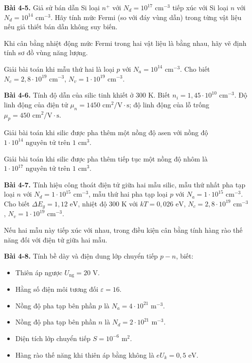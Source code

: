\expandafter\def\csname debai@4-5\endcsname{
\textbf{Bài 4-5.} Giả sử bán dẫn Si loại $n^+$ với $N_d = 10^{17}\text{ cm}^{-3}$ tiếp xúc với Si loại $n$ với $N_d = 10^{14}\text{ cm}^{-3}$. Hãy tính mức Fermi (so với đáy vùng dẫn) trong từng vật liệu nếu giả thiết bán dẫn không suy biến.

Khi cân bằng nhiệt động mức Fermi trong hai vật liệu là bằng nhau, hãy vẽ định tính sơ đồ vùng năng lượng.

Giải bài toán khi mẫu thứ hai là loại $p$ với $N_a = 10^{14}\text{ cm}^{-3}$. Cho biết $N_c = 2{,}8 \cdot 10^{19}\text{ cm}^{-3}$, $N_v = 1 \cdot 10^{19}\text{ cm}^{-3}$.
}

\expandafter\def\csname debai@4-6\endcsname{
\textbf{Bài 4-6.} Tính độ dẫn của silic tinh khiết ở $300\text{ K}$. Biết $n_i = 1{,}45 \cdot 10^{10}\text{ cm}^{-3}$. Độ linh động của điện tử $\mu_n = 1450\text{ cm}^2/\text{V}\cdot\text{s}$; độ linh động của lỗ trống $\mu_p = 450\text{ cm}^2/\text{V}\cdot\text{s}$.

Giải bài toán khi silic được pha thêm một nồng độ asen với nồng độ $1 \cdot 10^{14}\text{ nguyên tử trên } 1\text{ cm}^3$.

Giải bài toán khi silic được pha thêm tiếp tục một nồng độ nhôm là $1 \cdot 10^{17}\text{ nguyên tử trên } 1\text{ cm}^3$.
}

\expandafter\def\csname debai@4-7\endcsname{
\textbf{Bài 4-7.} Tính hiệu công thoát điện tử giữa hai mẫu silic, mẫu thứ nhất pha tạp loại $n$ với $N_d = 1 \cdot 10^{15}\text{ cm}^{-3}$, mẫu thứ hai pha tạp loại $p$ với $N_a = 1 \cdot 10^{15}\text{ cm}^{-3}$. Cho biết $\Delta E_g = 1{,}12\text{ eV}$, nhiệt độ $300\text{ K}$ với $kT = 0{,}026\text{ eV}$, $N_c = 2{,}8 \cdot 10^{19}\text{ cm}^{-3}$, $N_v = 1 \cdot 10^{19}\text{ cm}^{-3}$.

Nếu hai mẫu này tiếp xúc với nhau, trong điều kiện cân bằng tính hàng rào thế năng đối với điện tử giữa hai mẫu.
}

\expandafter\def\csname debai@4-8\endcsname{
\textbf{Bài 4-8.} Tính bề dày và điện dung lớp chuyển tiếp $p - n$, biết:
\begin{itemize}[itemsep=1pt, topsep=2pt, leftmargin=1.8em]
  \item Thiên áp ngược $U_{\text{ng}} = 20\text{ V}$.
  \item Hằng số điện môi tương đối $\varepsilon = 16$.
  \item Nồng độ pha tạp bên phần $p$ là $N_a = 4 \cdot 10^{21}\text{ m}^{-3}$.
  \item Nồng độ pha tạp bên phần $n$ là $N_d = 2 \cdot 10^{21}\text{ m}^{-3}$.
  \item Diện tích lớp chuyển tiếp $S = 10^{-6}\text{ m}^2$.
  \item Hàng rào thế năng khi thiên áp bằng không là $eU_k = 0{,}5\text{ eV}$.
\end{itemize}
}

